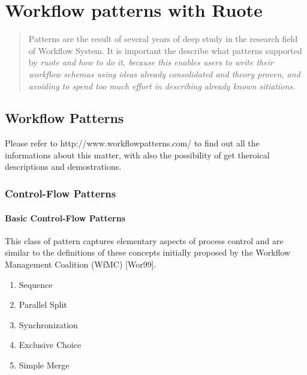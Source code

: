 
\chapter{Workflow patterns with Ruote}

\begin{quote}
Patterns are the result of several years of deep study in the research
field of Workflow System. It is important the describe what patterns supported
by \em{ruote} and how to do it, because this enables users to write their 
workflow schemas using ideas already consolidated and theory proven, and avoiding
to spend too much effort in describing already known sitiations. 
\end{quote}


\section{Workflow Patterns}

Please refer to http://www.workflowpatterns.com/ to find out all the informations about
this matter, with also the possibility of get theroical descriptions and demostrations.

\subsection{Control-Flow Patterns}

\subsubsection{Basic Control-Flow Patterns}

This class of pattern captures elementary aspects of process control and are similar to the definitions of these concepts initially proposed by the Workflow Management Coalition (WfMC) [Wor99]. 

\begin{enumerate}
 \item Sequence 
 \item Parallel Split
 \item Synchronization
 \item Exclusive Choice
 \item Simple Merge
\end{enumerate}
